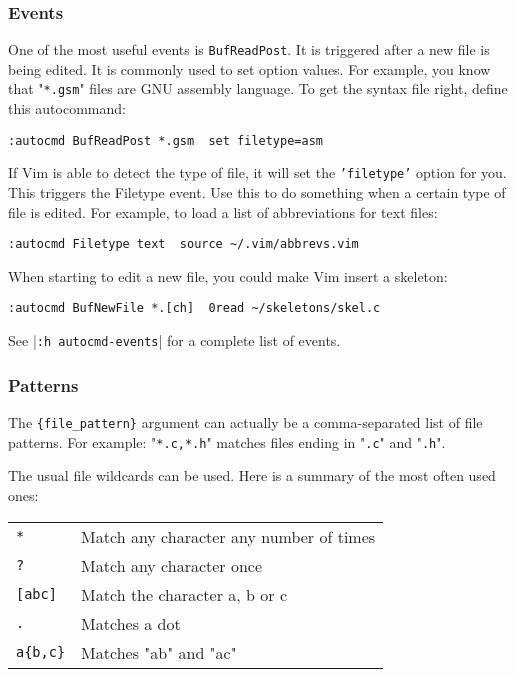 \subsubsection{Events}
One of the most useful events is \texttt{BufReadPost}.
It is triggered after a new file is being edited.
It is commonly used to set option values.
For example, you know that "\texttt{*.gsm}" files are GNU assembly language.
To get the syntax file right, define this autocommand:

\begin{Verbatim}[samepage=true]
 :autocmd BufReadPost *.gsm  set filetype=asm
\end{Verbatim}

If Vim is able to detect the type of file, it will set the \texttt{'filetype'} option for you.
This triggers the Filetype event.
Use this to do something when a certain type of file is edited.
For example, to load a list of abbreviations for text files:

\begin{Verbatim}[samepage=true]
 :autocmd Filetype text  source ~/.vim/abbrevs.vim
\end{Verbatim}

When starting to edit a new file, you could make Vim insert a skeleton:

\begin{Verbatim}[samepage=true]
 :autocmd BufNewFile *.[ch]  0read ~/skeletons/skel.c
\end{Verbatim}

See |\texttt{:h autocmd-events}| for a complete list of events.

\subsubsection{Patterns}
The \texttt{\{file\_pattern\}} argument can actually be a comma-separated list of file patterns.
For example: "\texttt{*.c,*.h}" matches files ending in "\texttt{.c}" and "\texttt{.h}".

The usual file wildcards can be used.
Here is a summary of the most often used ones:

\begin{center} \begin{tabular}{l l}
				\texttt{*} & Match any character any number of times \\
				\texttt{?} & Match any character once \\
				\texttt{[abc]} & Match the character a, b or c \\
				\texttt{.} & Matches a dot \\
				\texttt{a\{b,c\}} & Matches "ab" and "ac" \\
\end{tabular} \end{center}

